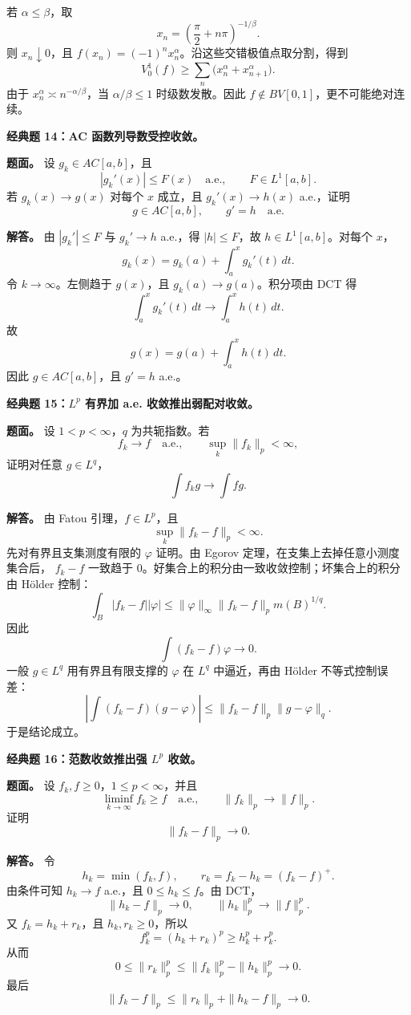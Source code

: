 \documentclass[
UTF8]{ctexart}
\newcommand{\impA}{\hspace{0.4em}{\small\textcolor{impAColor}{\textbf{[A 核心]}}}}
\newcommand{\impB}{\hspace{0.4em}{\small\textcolor{impBColor}{\textbf{[B 重要]}}}}
\begin{document}
若 \(\alpha\le\beta\)，取
\[
  x_n=\left(\frac{\pi}{2}+n\pi\right)^{-1/\beta}.
\]
则 \(x_n\downarrow0\)，且 \(f(x_n)=(-1)^n x_n^\alpha\)。沿这些交错极值点取分割，得到
\[
  V_0^1(f)\ge \sum_n\bigl(x_n^\alpha+x_{n+1}^\alpha\bigr).
\]
由于 \(x_n^\alpha\asymp n^{-\alpha/\beta}\)，当 \(\alpha/\beta\le1\) 时级数发散。因此
\(f\notin BV[0,1]\)，更不可能绝对连续。

\textbf{经典题 14：AC 函数列导数受控收敛。}\impA

\textbf{题面。} 设 \(g_k\in AC[a,b]\)，且
\[
  |g_k'(x)|\le F(x)\quad\text{a.e.},\qquad F\in L^1[a,b].
\]
若 \(g_k(x)\to g(x)\) 对每个 \(x\) 成立，且 \(g_k'(x)\to h(x)\) a.e.，证明
\[
  g\in AC[a,b],\qquad g'=h\quad\text{a.e.}
\]

\textbf{解答。} 由 \(|g_k'|\le F\) 与 \(g_k'\to h\) a.e.，得 \(|h|\le F\)，故
\(h\in L^1[a,b]\)。对每个 \(x\)，
\[
  g_k(x)=g_k(a)+\int_a^x g_k'(t)\,dt.
\]
令 \(k\to\infty\)。左侧趋于 \(g(x)\)，且 \(g_k(a)\to g(a)\)。积分项由 DCT 得
\[
  \int_a^x g_k'(t)\,dt\to\int_a^x h(t)\,dt.
\]
故
\[
  g(x)=g(a)+\int_a^x h(t)\,dt.
\]
因此 \(g\in AC[a,b]\)，且 \(g'=h\) a.e.。

\textbf{经典题 15：\(L^p\) 有界加 a.e. 收敛推出弱配对收敛。}\impA

\textbf{题面。} 设 \(1<p<\infty\)，\(q\) 为共轭指数。若
\[
  f_k\to f\quad\text{a.e.},\qquad \sup_k\|f_k\|_p<\infty,
\]
证明对任意 \(g\in L^q\)，
\[
  \int f_k g\to\int fg.
\]

\textbf{解答。} 由 Fatou 引理，\(f\in L^p\)，且
\[
  \sup_k\|f_k-f\|_p<\infty.
\]
先对有界且支集测度有限的 \(\varphi\) 证明。由 Egorov 定理，在支集上去掉任意小测度集合后，
\(f_k-f\) 一致趋于 \(0\)。好集合上的积分由一致收敛控制；坏集合上的积分由 Hölder 控制：
\[
  \int_B |f_k-f||\varphi|
  \le \|\varphi\|_\infty \|f_k-f\|_p m(B)^{1/q}.
\]
因此
\[
  \int(f_k-f)\varphi\to0.
\]
一般 \(g\in L^q\) 用有界且有限支撑的 \(\varphi\) 在 \(L^q\) 中逼近，再由 Hölder 不等式控制误差：
\[
  \left|\int(f_k-f)(g-\varphi)\right|
  \le \|f_k-f\|_p\|g-\varphi\|_q.
\]
于是结论成立。

\textbf{经典题 16：范数收敛推出强 \(L^p\) 收敛。}\impB

\textbf{题面。} 设 \(f_k,f\ge0\)，\(1\le p<\infty\)，并且
\[
  \liminf_{k\to\infty}f_k\ge f\quad\text{a.e.},\qquad
  \|f_k\|_p\to\|f\|_p.
\]
证明
\[
  \|f_k-f\|_p\to0.
\]

\textbf{解答。} 令
\[
  h_k=\min(f_k,f),\qquad r_k=f_k-h_k=(f_k-f)^+.
\]
由条件可知 \(h_k\to f\) a.e.，且 \(0\le h_k\le f\)。由 DCT，
\[
  \|h_k-f\|_p\to0,\qquad \|h_k\|_p^p\to\|f\|_p^p.
\]
又 \(f_k=h_k+r_k\)，且 \(h_k,r_k\ge0\)，所以
\[
  f_k^p=(h_k+r_k)^p\ge h_k^p+r_k^p.
\]
从而
\[
  0\le \|r_k\|_p^p
  \le \|f_k\|_p^p-\|h_k\|_p^p\to0.
\]
最后
\[
  \|f_k-f\|_p\le \|r_k\|_p+\|h_k-f\|_p\to0.
\]
\end{document}
